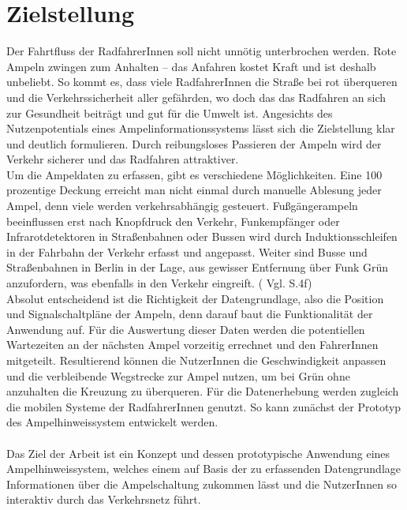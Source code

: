 \section{Zielstellung}
Der Fahrtfluss der RadfahrerInnen soll nicht unnötig unterbrochen werden. Rote Ampeln zwingen zum Anhalten -- das Anfahren kostet Kraft und ist deshalb unbeliebt. So kommt es, dass viele RadfahrerInnen die Straße bei rot überqueren und die Verkehrssicherheit aller gefährden, wo doch das das Radfahren an sich zur Gesundheit beiträgt und gut für die Umwelt ist. Angesichts des Nutzenpotentials eines Ampelinformationssystems lässt sich die Zielstellung klar und deutlich formulieren. Durch reibungsloses Passieren der Ampeln wird der Verkehr sicherer und das Radfahren attraktiver.\\
Um die Ampeldaten zu erfassen, gibt es verschiedene Möglichkeiten. Eine 100 prozentige Deckung erreicht man nicht einmal durch manuelle Ablesung jeder Ampel, denn viele  werden verkehrsabhängig gesteuert. Fußgängerampeln beeinflussen erst nach Knopfdruck den Verkehr, Funkempfänger oder Infrarotdetektoren in Straßenbahnen oder Bussen wird durch Induktionsschleifen in der Fahrbahn der Verkehr erfasst und angepasst. Weiter sind Busse und Straßenbahnen in Berlin in der Lage, aus gewisser Entfernung über Funk Grün anzufordern, was ebenfalls in den Verkehr eingreift. ( Vgl. \cite{lsa_bln} S.4f) \\
Absolut entscheidend ist die Richtigkeit der Datengrundlage, also die Position und Signalschaltpläne der Ampeln, denn darauf baut die Funktionalität der Anwendung auf.
Für die Auswertung dieser Daten werden die potentiellen Wartezeiten an der nächsten Ampel vorzeitig errechnet und den FahrerInnen mitgeteilt. Resultierend können die NutzerInnen die Geschwindigkeit anpassen und die verbleibende Wegstrecke zur Ampel nutzen, um bei Grün ohne anzuhalten die Kreuzung zu überqueren. Für die Datenerhebung werden zugleich die mobilen Systeme der RadfahrerInnen genutzt. So kann zunächst der Prototyp des Ampelhinweissystem entwickelt werden.\\\\
Das Ziel der Arbeit ist ein Konzept und dessen prototypische Anwendung eines Ampelhinweissystem, welches einem auf Basis der zu erfassenden Datengrundlage Informationen über die Ampelschaltung zukommen lässt und die NutzerInnen so interaktiv durch das Verkehrsnetz führt.
%
%
